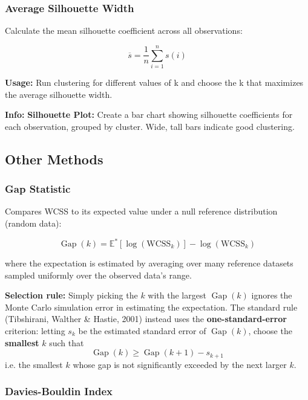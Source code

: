 \documentclass[
]{article}
\begin{document}
\subsubsection{Average Silhouette Width}

Calculate the mean silhouette coefficient across all observations:

\[\overline{s} = \frac{1}{n}\sum_{i = 1}^{n}s(i)\]

\textbf{Usage:} Run clustering for different values of k and choose the
k that maximizes the average silhouette width.

\textbf{Info: } \textbf{Silhouette Plot:} Create a bar chart showing
silhouette coefficients for each observation, grouped by cluster. Wide,
tall bars indicate good clustering.

\textbf{ }

\subsection{Other Methods}

\subsubsection{Gap Statistic}

Compares WCSS to its expected value under a null reference distribution
(random data):

\[\operatorname{Gap}(k) = {\mathbb{E}}^{\ast}\left\lbrack \log(\text{WCSS}_{k}) \right\rbrack - \log(\text{WCSS}_{k})\]

where the expectation is estimated by averaging over many reference
datasets sampled uniformly over the observed data's range.

\textbf{Selection rule:} Simply picking the \(k\) with the largest
\(\operatorname{Gap}(k)\) ignores the Monte Carlo simulation error in
estimating the expectation. The standard rule (Tibshirani, Walther \&
Hastie, 2001) instead uses the \textbf{one-standard-error} criterion:
letting \(s_{k}\) be the estimated standard error of
\(\operatorname{Gap}(k)\), choose the \textbf{smallest} \(k\) such that
\[\operatorname{Gap}(k) \geq \operatorname{Gap}(k + 1) - s_{k + 1}\]
i.e. the smallest \(k\) whose gap is not significantly exceeded by the
next larger \(k\).

\subsubsection{Davies-Bouldin Index}
\end{document}
